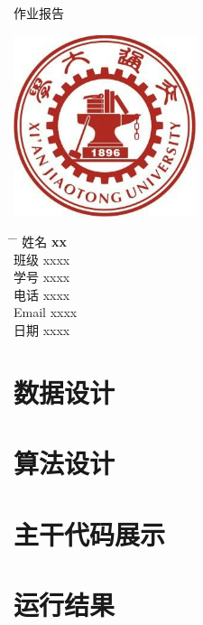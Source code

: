 \documentclass[UTF8]{ctexart}
\begin{document}
\begin{titlepage}
    \begin{center}
        \Huge{作业报告}
        \noindent{\color{BrickRed} \rule{\linewidth}{1mm}}
        \Huge
        \vspace{0.5cm}
		\LARGE
		\vspace{1.5cm}
		\textbf{}

        \includegraphics[width=0.4\textwidth]{school_emblem.png}

        \vspace{1.5cm}
    \end{center}
    \Large
    \begin{tabbing}
        \hspace*{1em}\= \hspace*{8em} \= \kill %
        \> 姓名 \>  \textbf{xx} \\
        \> 班级 \>  xxxx \\
        \> 学号 \>  xxxx  \\
        \> 电话  \> xxxx \\
        \> Email \> xxxx \\
        \> 日期 \>  xxxx
    \end{tabbing}
    
\end{titlepage}
\setlength{\headheight}{22pt}
\tableofcontents
\newpage{}
\section{数据设计}
\section{算法设计}
\section{主干代码展示}
\section{运行结果}
\end{document}

